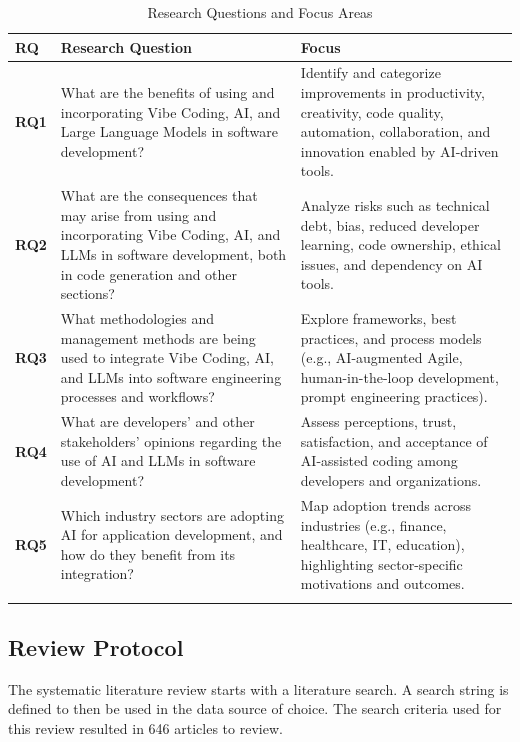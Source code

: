 {\small
\begin{longtable}{p{0.7cm} p{7.5cm} p{6.5cm}}
\caption{Research Questions and Focus Areas}
\label{tab:RQs} \\
\toprule
\textbf{RQ} & \textbf{Research Question} & \textbf{Focus} \\
\midrule
\endfirsthead

\bottomrule
\endlastfoot

\textbf{RQ1} & What are the benefits of using and incorporating Vibe Coding, AI, and Large Language Models in software development? & Identify and categorize improvements in productivity, creativity, code quality, automation, collaboration, and innovation enabled by AI-driven tools. \\
\addlinespace

\textbf{RQ2} & What are the consequences that may arise from using and incorporating Vibe Coding, AI, and LLMs in software development, both in code generation and other sections? & Analyze risks such as technical debt, bias, reduced developer learning, code ownership, ethical issues, and dependency on AI tools. \\
\addlinespace

\textbf{RQ3} & What methodologies and management methods are being used to integrate Vibe Coding, AI, and LLMs into software engineering processes and workflows? & Explore frameworks, best practices, and process models (e.g., AI-augmented Agile, human-in-the-loop development, prompt engineering practices). \\
\addlinespace

\textbf{RQ4} & What are developers’ and other stakeholders’ opinions regarding the use of AI and LLMs in software development? & Assess perceptions, trust, satisfaction, and acceptance of AI-assisted coding among developers and organizations. \\
\addlinespace

\textbf{RQ5} & Which industry sectors are adopting AI for application development, and how do they benefit from its integration? & Map adoption trends across industries (e.g., finance, healthcare, IT, education), highlighting sector-specific motivations and outcomes. \\
\addlinespace

\end{longtable}}

\subsection{Review Protocol}
The systematic literature review starts with a literature search. A search string is defined to then be used in the data source of choice. The search criteria used for this review resulted in 646 articles to review.

